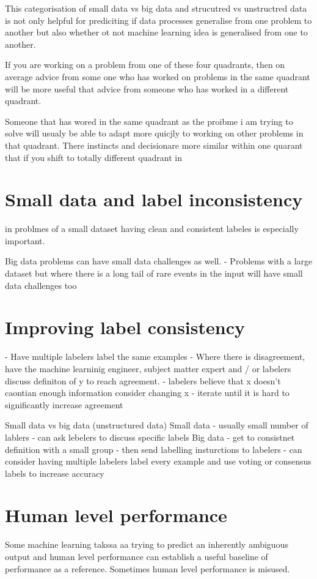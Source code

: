 This categorisation of small data vs big data and strucutred vs unstructred data is not only helpful for prediciting if data processes generalise from one problem to another but also whether ot not machine learning idea is generalised from one to another.

If you are working on a problem from one of these four quadrants, then on average advice from some one who has worked on problems in the same quadrant will be more useful that advice from someone who has worked in a different quadrant.

Someone that has wored in the same quadrant as the proibme i am trying to solve will usualy be able to adapt more quicjly to working on other problems in that quadrant.
There instincts and decisionare more similar within one quarant that if you shift to totally different quadrant in

\section{Small data and label inconsistency}

in problmes of a small dataset having clean and consistent labeles is especially important.

Big data problems can have small data challenges as well.
- Problems with a large dataset but where there is a long tail of rare events in the input will have small data challenges too

\section{Improving label consistency}

- Have multiple labelers label the same examples
- Where there is disagreement, have the machine learninig engineer, subject matter expert and / or labelers discuss definiton of y to reach agreement.
- labelers believe that x doesn't caontian enough information consider changing x
- iterate until it is hard to significantly increase agreement


Small data vs big data (unstructured data)
Small data
- usually small number of lablers
- can ask lebelers to discuss specific labels
Big data
- get to consistnet definition with a small group
- then send labelling insturctions to labelers
- can consider having multiple labelers label every example and use voting or consensus labels to increase accuracy

\section{Human level performance}
Some machine learning takssa aa trying to predict an inherently ambiguous output and human level performance can establish a useful baseline of performance as a reference.
Sometimes human level performance is misused.

